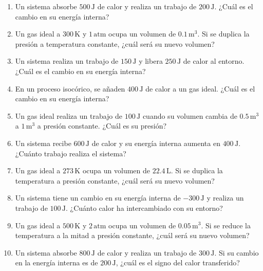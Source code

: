 \documentclass[../main]{subfiles}
\begin{document}
\begin{enumerate}
    \item Un sistema absorbe $500 \, \text{J}$ de calor y realiza un trabajo de $200 \, \text{J}$. ¿Cuál es el cambio en su energía interna?
    \item Un gas ideal a $300 \, \text{K}$ y $1 \, \text{atm}$ ocupa un volumen de $0.1 \, \text{m}^3$. Si se duplica la presión a temperatura constante, ¿cuál será su nuevo volumen?
    \item Un sistema realiza un trabajo de $150 \, \text{J}$ y libera $250 \, \text{J}$ de calor al entorno. ¿Cuál es el cambio en su energía interna?
    \item En un proceso isocórico, se añaden $400 \, \text{J}$ de calor a un gas ideal. ¿Cuál es el cambio en su energía interna?
    \item Un gas ideal realiza un trabajo de $100 \, \text{J}$ cuando su volumen cambia de $0.5 \, \text{m}^3$ a $1 \, \text{m}^3$ a presión constante. ¿Cuál es su presión?
    \item Un sistema recibe $600 \, \text{J}$ de calor y su energía interna aumenta en $400 \, \text{J}$. ¿Cuánto trabajo realiza el sistema?
    \item Un gas ideal a $273 \, \text{K}$ ocupa un volumen de $22.4 \, \text{L}$. Si se duplica la temperatura a presión constante, ¿cuál será su nuevo volumen?
    \item Un sistema tiene un cambio en su energía interna de $-300 \, \text{J}$ y realiza un trabajo de $100 \, \text{J}$. ¿Cuánto calor ha intercambiado con su entorno?
    \item Un gas ideal a $500 \, \text{K}$ y $2 \, \text{atm}$ ocupa un volumen de $0.05 \, \text{m}^3$. Si se reduce la temperatura a la mitad a presión constante, ¿cuál será su nuevo volumen?
    \item Un sistema absorbe $800 \, \text{J}$ de calor y realiza un trabajo de $300 \, \text{J}$. Si su cambio en la energía interna es de $200 \, \text{J}$, ¿cuál es el signo del calor transferido?
\end{enumerate}
\end{document}
